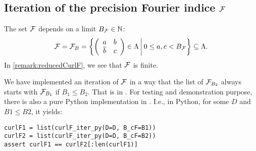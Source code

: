 \subsection{Iteration of the precision Fourier indice $\mathcal{F}$}

The set $\mathcal{F}$ depends on a limit $B_{\mathcal{F}} \in \mathbb{N}$:
\[ \F = \F_B = \Set{\SimpleMatrix{a}{b}{\overline b}{c} \in \Lambda}{0 \le a , c < B_{\F}} \subseteq \Lambda . \]
In \cref{remark:reducedCurlF}, we see that $\mathcal{F}$ is finite.

We have implemented an iteration of $\mathcal{F}$ in a way that the list of $\mathcal{F}_{B_2}$ always starts with $\mathcal{F}_{B_1}$ if $B_1 \le B_2$. That is  in . For testing and demonstration purpose, there is also a pure Python implementation  in . I.e., in Python, for some $D$ and $B1 \le B2$, it yields:
\begin{lstlisting}
curlF1 = list(curlF_iter_py(D=D, B_cF=B1))
curlF2 = list(curlF_iter_py(D=D, B_cF=B2))
assert curlF1 == curlF2[:len(curlF1)]
\end{lstlisting}

